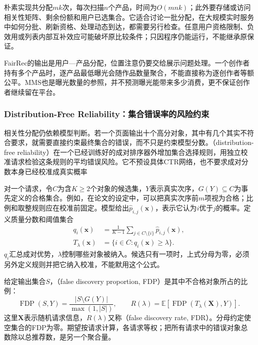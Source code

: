 朴素实现共分配$mk$次，每次扫描$n$个产品，时间为$O(mnk)$；此外要存储或访问相关性矩阵、剩余份额和用户已选集合。它适合讨论一批分配，在大规模实时服务中如何分批、刷新资格、处理动态到达，都需要另行检查。任意用户资格限制、负效用或列表内部互补效应可能破坏原比较条件；只因程序仍能运行，不能继承原保证。

FairRec的输出是用户—产品分配，位置注意仍要交给展示问题处理。一个创作者持有多个产品时，逐产品最低曝光会随作品数量聚合，不能直接称为逐创作者等额公平。MMS也是曝光数量的参照，并不预测曝光能带来多少消费，更不保证创作者继续留在平台。

\subsubsection{Distribution-Free Reliability：集合错误率的风险约束}
\label{sec:rs-distribution-free-reliability}

相关性分配仍依赖模型判断。若一个页面输出十个高分对象，其中有几个其实不符合要求，就需要直接约束最终集合的错误，而不只是约束模型分数。（distribution-free reliability）在一个已经训练好的成对排序器外增加集合选择规则，用独立校准请求检验这条规则的平均错误风险。它不预设具体CTR网络，也不要求成对分数本身已经校准成真实概率

对一个请求，令$C$为含$K\geq2$个对象的候选集，$Y$表示真实次序，$G(Y)\subseteq C$为事先定义的合格集合。例如，在论文的设定中，可以把真实次序前$m$项视为合格；比例和取整规则应在校准前固定。模型给出$\widehat p_{i,j}(\bm{x})$，表示它认为$i$优于$j$的概率。定义质量分数和阈值集合
\begin{equation}
 \begin{aligned}
  q_i(\bm{x})&=\frac{1}{K-1}
           \sum_{j\in C\setminus\{i\}}\widehat p_{i,j}(\bm{x}),\\
  T_\lambda(\bm{x})&=\{i\in C:q_i(\bm{x})\geq\lambda\}.
 \end{aligned}
 \label{eq:rs-risk-set}
\end{equation}
$q_i$汇总成对优势，$\lambda$控制哪些对象被纳入。候选只有一项时，上式分母为零，必须另外定义规则并把它纳入校准，不能默用这个公式。

给定输出集合$S$，（false discovery proportion, FDP）是其中不合格对象所占的比例：
\begin{equation}
 \operatorname{FDP}(S,Y)
 =\frac{|S\setminus G(Y)|}{\max(1,|S|)},
 \qquad
 R(\lambda)=\mathbb{E}\!
  \left[\operatorname{FDP}(T_\lambda(\bm{X}),Y)\right].
 \label{eq:rs-fdp-risk}
\end{equation}
这里$\bm{X}$表示随机请求信息，$R(\lambda)$又称（false discovery rate, FDR）。分母约定使空集合的FDP为零。期望按请求计算，各请求等权；把所有请求中的错误对象总数除以总推荐数，是另一个聚合量。

